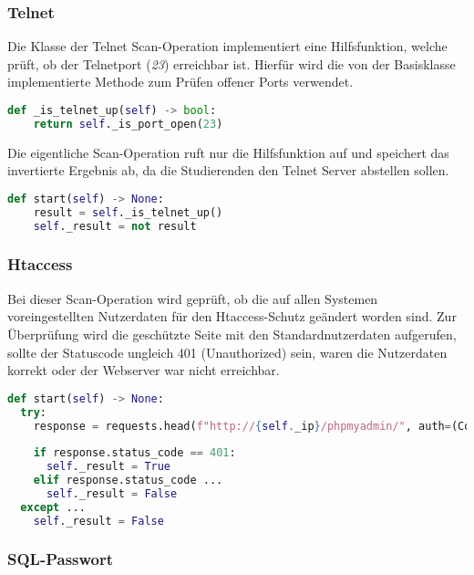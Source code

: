 \subsubsection{Telnet}
Die Klasse der Telnet Scan-Operation implementiert eine Hilfsfunktion, welche prüft, ob der Telnetport (\textit{23}) erreichbar ist. Hierfür wird die von der Basisklasse implementierte Methode zum Prüfen offener Ports verwendet.

\begin{lstlisting}[language=Python, frame=single, caption={Big Brother Telnet}, captionpos=b, label={lst:bigbrother-telnet}]
def _is_telnet_up(self) -> bool:
	return self._is_port_open(23)
\end{lstlisting}

Die eigentliche Scan-Operation ruft nur die Hilfsfunktion auf und speichert das invertierte Ergebnis ab, da die Studierenden den Telnet Server abstellen sollen.

\begin{lstlisting}[language=Python, frame=single, caption={Big Brother Telnet}, captionpos=b, label={lst:bigbrother-telnet}]
def start(self) -> None:
	result = self._is_telnet_up()
	self._result = not result
\end{lstlisting}

\subsubsection{Htaccess}

Bei dieser Scan-Operation wird geprüft, ob die auf allen Systemen voreingestellten Nutzerdaten für den Htaccess-Schutz geändert worden sind. Zur Überprüfung wird die geschützte Seite mit den Standardnutzerdaten aufgerufen, sollte der Statuscode ungleich 401 (Unauthorized) sein, waren die Nutzerdaten korrekt oder der Webserver war nicht erreichbar.
\begin{lstlisting}[language=Python, frame=single, caption={Big Brother Htaccess}, captionpos=b, label={lst:bigbrother-htaccess}]
def start(self) -> None:
  try:
    response = requests.head(f"http://{self._ip}/phpmyadmin/", auth=(Config.operations['htaccess']['username'], Config.operations['htaccess']['password']))
    
    if response.status_code == 401:
      self._result = True
    elif response.status_code ...
      self._result = False
  except ...
    self._result = False
\end{lstlisting}

\subsubsection{SQL-Passwort}

